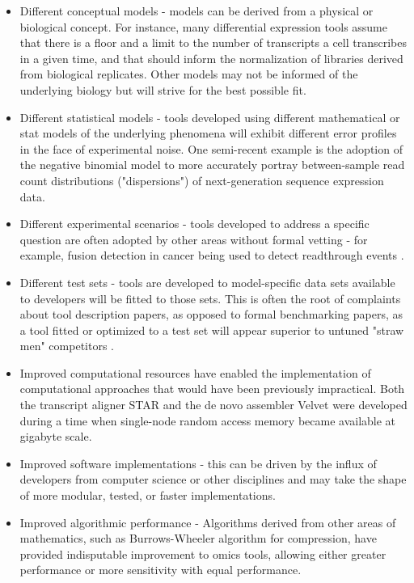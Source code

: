 \documentclass{drexelthesis}
\begin{document}
\begin{itemize}
	\item Different conceptual models - models can be derived from a physical or biological concept. For instance, many differential expression tools assume that there is a floor and a limit to the number of transcripts a cell transcribes in a given time, and that should inform the normalization of libraries derived from biological replicates. Other models may not be informed of the underlying biology but will strive for the best possible fit.

	\item Different statistical models - tools developed using different mathematical or stat models of the underlying phenomena will exhibit different error profiles in the face of experimental noise. One semi-recent example is the adoption of the negative binomial model to more accurately portray between-sample read count distributions ("dispersions") of next-generation sequence expression data.

	\item Different experimental scenarios - tools developed to address a specific question are often adopted by other areas without formal vetting - for example, fusion detection in cancer being used to detect readthrough events \cite{Haas2019-rq}.

	\item Different test sets - tools are developed to model-specific data sets available to developers will be fitted to those sets. This is often the root of complaints about tool description papers, as opposed to formal benchmarking papers, as a tool fitted or optimized to a test set will appear superior to untuned "straw men" competitors \cite{Buchka2021-fa,Peters2018-av}.

	\item Improved computational resources have enabled the implementation of computational approaches that would have been previously impractical. Both the transcript aligner STAR and the de novo assembler Velvet were developed during a time when single-node random access memory became available at gigabyte scale.

	\item Improved software implementations - this can be driven by the influx of developers from computer science or other disciplines and may take the shape of more modular, tested, or faster implementations.

	\item Improved algorithmic performance - Algorithms derived from other areas of mathematics, such as Burrows-Wheeler algorithm for compression, have provided indisputable improvement to omics tools, allowing either greater performance or more sensitivity with equal performance.


\end{itemize}
\end{document}
